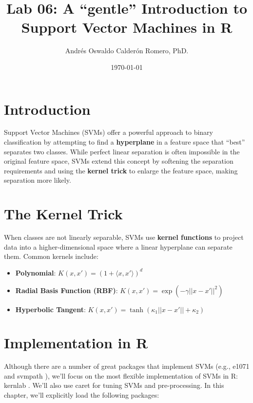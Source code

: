\documentclass{article}
\title{Lab 06: A ``gentle'' Introduction to Support Vector Machines in R}
\author{Andrés Oswaldo Calderón Romero, PhD.}
\date{\today}
\begin{document}
\maketitle

\section{Introduction}
Support Vector Machines (SVMs) offer a powerful approach to binary classification by attempting to find a \textbf{hyperplane} in a feature space that ``best'' separates two classes. While perfect linear separation is often impossible in the original feature space, SVMs extend this concept by softening the separation requirements and using the \textbf{kernel trick} to enlarge the feature space, making separation more likely.

\section{The Kernel Trick}
When classes are not linearly separable, SVMs use \textbf{kernel functions} to project data into a higher-dimensional space where a linear hyperplane can separate them. Common kernels include:

\begin{itemize}
    \item \textbf{Polynomial}: $K(x, x') = (1 + \langle x, x' \rangle)^d$

    \item \textbf{Radial Basis Function (RBF)}: $K(x, x') = \exp(-\gamma ||x - x'||^2)$

    \item \textbf{Hyperbolic Tangent}: $K(x, x') = \tanh(\kappa_1 ||x - x'|| + \kappa_2)$
\end{itemize}

\section{Implementation in R}
Although there are a number of great packages that implement SVMs (e.g., e1071 \parencite{meyer2019e1071} and svmpath \parencite{hastie2016svmpath}), we’ll focus on the most flexible implementation of SVMs in R: kernlab \parencite{karatzoglou2004kernlab}. We’ll also use caret for tuning SVMs and pre-processing. In this chapter, we’ll explicitly load the following packages:
\end{document}
